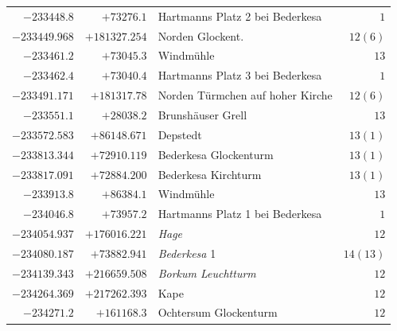 \begin{center}
\begin{tabular}{r|r|p{170pt}|r}
\(-233448.8\)&\(+73276.1\)&Hartmanns Platz 2 bei Bederkesa&\(1\)\\
\(-233449.968\)&\(+181327.254\)&Norden Glockent.&\(12(6)\)\\
\(-233461.2\)&\(+73045.3\)&Windmühle&\(13\)\\
\(-233462.4\)&\(+73040.4\)&Hartmanns Platz 3 bei Bederkesa&\(1\)\\
\(-233491.171\)&\(+181317.78\)&Norden Türmchen auf hoher Kirche&\(12(6)\)\\
\(-233551.1\)&\(+28038.2\)&Brunshäuser Grell&\(13\)\\
\(-233572.583\)&\(+86148.671\)&Depstedt&\(13(1)\)\\
\(-233813.344\)&\(+72910.119\)&Bederkesa Glockenturm&\(13(1)\)\\
\(-233817.091\)&\(+72884.200\)&Bederkesa Kirchturm&\(13(1)\)\\
\(-233913.8\)&\(+86384.1\)&Windmühle&\(13\)\\
\(-234046.8\)&\(+73957.2\)&Hartmanns Platz 1 bei Bederkesa&\(1\)\\
\(-234054.937\)&\(+176016.221\)&\textit{Hage}&\(12\)\\
\(-234080.187\)&\(+73882.941\)&\textit{Bederkesa} 1&\(14(13)\)\\
\(-234139.343\)&\(+216659.508\)&\textit{Borkum Leuchtturm}&\(12\)\\
\(-234264.369\)&\(+217262.393\)&Kape&\(12\)\\
\(-234271.2\)&\(+161168.3\)&Ochtersum Glockenturm&\(12\)\\
\hline\end{tabular}\endgroup\end{center}
\clearpage
